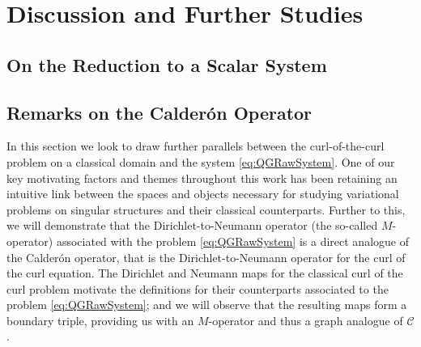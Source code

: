 \section{Discussion and Further Studies} \label{sec:CC-Discussion}

\subsection{On the Reduction to a Scalar System} \label{ssec:ReductionToScalar}


\subsection{Remarks on the Calder\'on Operator} \label{ssec:CalderonOp}

In this section we look to draw further parallels between the curl-of-the-curl problem on a classical domain and the system \eqref{eq:QGRawSystem}.
One of our key motivating factors and themes throughout this work has been retaining an intuitive link between the spaces and objects necessary for studying variational problems on singular structures and their classical counterparts.
Further to this, we will demonstrate that the Dirichlet-to-Neumann operator (the so-called $M$-operator) associated with the problem \eqref{eq:QGRawSystem} is a direct analogue of the Calder\'on operator, that is the Dirichlet-to-Neumann operator for the curl of the curl equation.
The Dirichlet and Neumann maps for the classical curl of the curl problem motivate the definitions for their counterparts associated to the problem \eqref{eq:QGRawSystem}; and we will observe that the resulting maps form a boundary triple, providing us with an $M$-operator and thus a graph analogue of $\mathcal{C}$.


